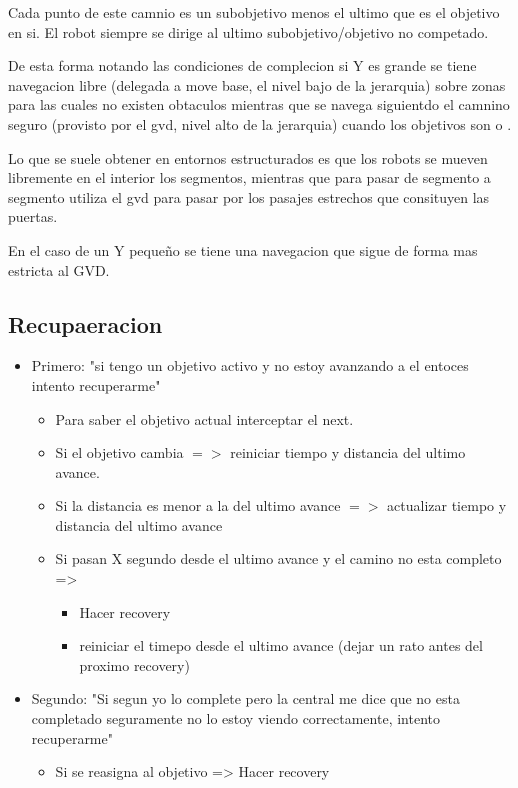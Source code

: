 Cada punto de este camnio es un subobjetivo menos el ultimo que es el objetivo
en si. El robot siempre se dirige al ultimo subobjetivo/objetivo no competado.

De esta forma notando las condiciones de complecion si Y es grande se tiene 
navegacion libre (delegada a move base, el nivel bajo de la jerarquia) sobre
zonas para las cuales no existen obtaculos mientras que se navega siguientdo el
camnino seguro (provisto por el gvd, nivel alto de la jerarquia) cuando los
objetivos son  o .

Lo que se suele obtener en entornos estructurados es que los robots se mueven
libremente en el interior los segmentos, mientras que para pasar de segmento a
segmento utiliza el gvd para pasar por los pasajes estrechos que consituyen las
puertas.

En el caso de un Y pequeño se tiene una navegacion que sigue de forma mas estricta al GVD.


\subsection{Recupaeracion}

\begin{itemize}
\item Primero: "si tengo un objetivo activo y no estoy avanzando a el entoces intento recuperarme"
  \begin{itemize}
  \item Para saber el objetivo actual interceptar el next.
   
  \item Si el objetivo cambia                           $=>$ reiniciar tiempo y distancia del ultimo avance.

  \item Si la distancia es menor a la del ultimo avance $=>$ actualizar tiempo y distancia del ultimo avance

  \item Si pasan X segundo desde el ultimo avance y el camino no esta completo =>
    \begin{itemize}
    \item Hacer recovery
    \item reiniciar el timepo desde el ultimo avance (dejar un rato antes del proximo recovery)
    \end{itemize}
  \end{itemize}

\item Segundo: "Si segun yo lo complete pero la central me dice que no esta completado seguramente no lo estoy viendo correctamente, intento recuperarme"
  \begin{itemize}
  \item Si se reasigna al objetivo => Hacer recovery
  \end{itemize}
\end{itemize}

